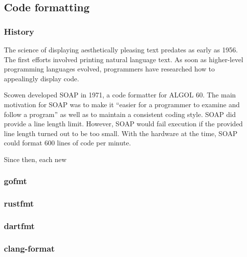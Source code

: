 \documentclass[11pt,a4paper]{article}
\begin{document}

\subsection{Code formatting}
\subsubsection{History}
The science of displaying aesthetically pleasing text predates as early as 1956\autocite{harris_keyboard_1956}.
The first efforts involved printing natural language text.
As soon as higher-level programming languages evolved, programmers have researched how to appealingly display code.

Scowen\autocite{scowen_soapprogram_1971} developed SOAP in 1971, a code formatter for ALGOL 60.
The main motivation for SOAP was to make it ``easier for a programmer to examine and follow a program'' as well as to maintain a consistent coding style.
SOAP did provide a line length limit.
However, SOAP would fail execution if the provided line length turned out to be too small.
With the hardware at the time, SOAP could format 600 lines of code per minute.

Since then, each new 

\subsubsection{gofmt}
\subsubsection{rustfmt}
\subsubsection{dartfmt}
\subsubsection{clang-format}
\end{document}
